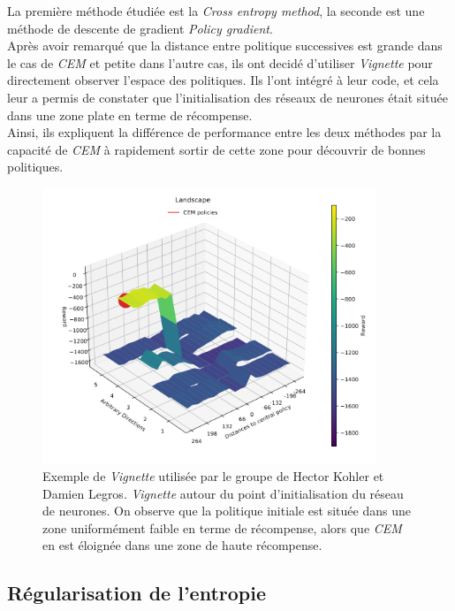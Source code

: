 \documentclass[12pt]{article}
\begin{document}
La première méthode étudiée est la \emph{Cross entropy method}, la seconde est une méthode de descente de gradient \emph{Policy gradient}. \\

Après avoir remarqué que la distance entre politique successives est grande dans le cas de \emph{CEM} et petite dans l'autre cas, ils ont decidé d'utiliser \emph{Vignette} pour directement observer l'espace des politiques. Ils l'ont intégré à leur code, et cela leur a permis de constater que l'initialisation des réseaux de neurones était située dans une zone plate en terme de récompense. \\

Ainsi, ils expliquent la différence de performance entre les deux méthodes par la capacité de \emph{CEM} à rapidement sortir de cette zone pour découvrir de bonnes politiques. \\

\begin{figure}[htp]
    \centering
    \includegraphics[width=10cm]{Images/cem_example}
    \caption{Exemple de \emph{Vignette} utilisée par le groupe de Hector Kohler et Damien Legros. \emph{Vignette} autour du point d'initialisation du réseau de neurones. On observe que la politique initiale est située dans une zone uniformément faible en terme de récompense, alors que \emph{CEM} en est éloignée dans une zone de haute récompense.}
    \label{fig:cemExample}
\end{figure}

\subsection{Régularisation de l'entropie}
\end{document}
